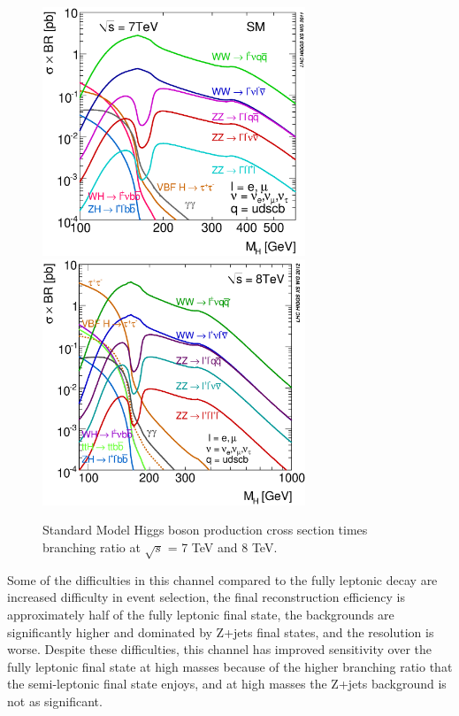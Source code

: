 \begin{figure}[htb]
\centering
\includegraphics[width=0.7\textwidth]{StandardModel/XSBR_7TeV_SM.eps} \includegraphics[width=0.7\textwidth]{StandardModel/XSBR_8TeV_SM_HM.eps}
\caption{\small Standard Model Higgs boson production cross section times branching ratio at $\sqrt{s}$ = 7 TeV and 8 TeV. ~\cite{LHC_Higgs_Gallery}
         }
\label{fig:XSBR}
\end{figure}



Some of the difficulties in this channel compared to the fully leptonic decay are increased difficulty in event selection, the final reconstruction efficiency is approximately half of the fully leptonic final state, the backgrounds are significantly higher and dominated by Z+jets final states, and the resolution is worse.  Despite these difficulties, this channel has improved sensitivity over the fully leptonic final state at high masses because of the higher branching ratio that the semi-leptonic final state enjoys, and at high masses the Z+jets background is not as significant.



